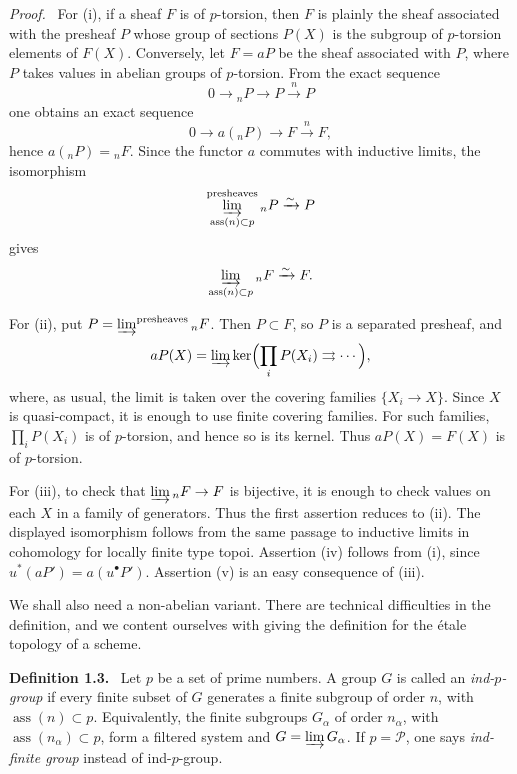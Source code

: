 \documentclass[11pt]{article}
\newcommand{\Ass}{\operatorname{ass}}
\newenvironment{statement}[1]{\par\medskip\noindent\textbf{#1.}\ }{\par\medskip}
\newenvironment{prooftext}{\par\noindent\emph{Proof.}\ }{\par\medskip}
\begin{document}
\begin{prooftext}
For (i), if a sheaf \(F\) is of \(p\)-torsion, then \(F\) is plainly the sheaf associated with the presheaf \(P\) whose group of sections \(P(X)\) is the subgroup of \(p\)-torsion elements of \(F(X)\). Conversely, let \(F=aP\) be the sheaf associated with \(P\), where \(P\) takes values in abelian groups of \(p\)-torsion. From the exact sequence
\[
0\longrightarrow {}_nP\longrightarrow P\xrightarrow{n}P
\]
one obtains an exact sequence
\[
0\longrightarrow a({}_nP)\longrightarrow F\xrightarrow{n}F,
\]
hence \(a({}_nP)={}_nF\). Since the functor \(a\) commutes with inductive limits, the isomorphism
\[
\varinjlim_{\Ass(n)\subset p}^{\mathrm{presheaves}}{}_nP\xrightarrow{\sim}P
\]
gives
\[
\varinjlim_{\Ass(n)\subset p}{}_nF\xrightarrow{\sim}F.
\]

For (ii), put \(P=\varinjlim^{\mathrm{presheaves}}{}_nF\). Then \(P\subset F\), so \(P\) is a separated presheaf, and
\[
aP(X)=\varinjlim \ker\Bigl(\prod_iP(X_i)\rightrightarrows\cdots\Bigr),
\]
where, as usual, the limit is taken over the covering families \(\{X_i\to X\}\). Since \(X\) is quasi-compact, it is enough to use finite covering families. For such families, \(\prod_iP(X_i)\) is of \(p\)-torsion, and hence so is its kernel. Thus \(aP(X)=F(X)\) is of \(p\)-torsion.

For (iii), to check that \(\varinjlim {}_nF\to F\) is bijective, it is enough to check values on each \(X\) in a family of generators. Thus the first assertion reduces to (ii). The displayed isomorphism follows from the same passage to inductive limits in cohomology for locally finite type topoi. Assertion (iv) follows from (i), since \(u^*(aP')=a(u^\bullet P')\). Assertion (v) is an easy consequence of (iii).
\end{prooftext}

We shall also need a non-abelian variant. There are technical difficulties in the definition, and we content ourselves with giving the definition for the \'etale topology of a scheme.

\begin{statement}{Definition 1.3}
Let \(p\) be a set of prime numbers. A group \(G\) is called an \emph{ind-\(p\)-group} if every finite subset of \(G\) generates a finite subgroup of order \(n\), with \(\Ass(n)\subset p\). Equivalently, the finite subgroups \(G_\alpha\) of order \(n_\alpha\), with \(\Ass(n_\alpha)\subset p\), form a filtered system and \(G=\varinjlim G_\alpha\). If \(p=\mathcal P\), one says \emph{ind-finite group} instead of ind-\(p\)-group.
\end{statement}
\end{document}
